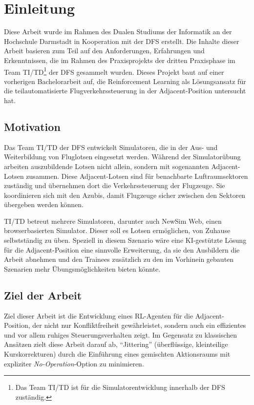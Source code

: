 \chapter{Einleitung}
\label{ch:intro}
Diese Arbeit wurde im Rahmen des Dualen Studiums der Informatik an der Hochschule Darmstadt in Kooperation mit der \ac{DFS} erstellt.
Die Inhalte dieser Arbeit basieren zum Teil auf den Anforderungen, Erfahrungen und Erkenntnissen, die im Rahmen des Praxisprojekts der dritten Praxisphase im Team 
TI/TD\footnote{Das Team TI/TD ist für die Simulatorentwicklung innerhalb der \ac{DFS} zuständig.} der \ac{DFS} gesammelt wurden. Dieses Projekt baut auf einer vorherigen Bachelorarbeit \cite{dominikDiez} auf, die Reinforcement Learning als Lösungsansatz für die teilautomatisierte Flugverkehrssteuerung in der Adjacent-Position untersucht hat.

%
%
\section{Motivation}
\label{sec:intro:motivation}
Das Team TI/TD der \ac{DFS} entwickelt Simulatoren, die in der Aus- und Weiterbildung von Fluglotsen eingesetzt werden. 
Während der Simulatorübung arbeiten auszubildende Lotsen nicht allein, sondern mit sogenannten Adjacent-Lotsen zusammen. Diese Adjacent-Lotsen sind für benachbarte Luftraumsektoren zuständig und übernehmen dort die Verkehrssteuerung der Flugzeuge. Sie koordinieren sich mit den Azubis, damit Flugzeuge sicher zwischen den Sektoren übergeben werden können. 
\medskip

TI/TD betreut mehrere Simulatoren, darunter auch NewSim Web, einen browserbasierten Simulator.
Dieser soll es Lotsen ermöglichen, von Zuhause selbstständig zu üben. Speziell in diesem Szenario wäre eine KI\hyp{}gestützte Lösung für die Adjacent-Position eine sinnvolle Erweiterung, da sie den Ausbildern die Arbeit abnehmen und den Trainees zusätzlich zu den im Vorhinein gebauten Szenarien mehr Übungsmöglichkeiten bieten könnte.
%
%
\section{Ziel der Arbeit}
\label{sec:intro:goal}

Ziel dieser Arbeit ist die Entwicklung eines \ac{RL}-Agenten für die Adjacent-Position, der nicht nur Konfliktfreiheit gewährleistet, sondern auch ein effizientes und vor allem ruhiges Steuerungsverhalten zeigt. Im Gegensatz zu klassischen Ansätzen zielt diese Arbeit darauf ab, \enquote{Jittering} (überflüssige, kleinteilige Kurskorrekturen) durch die Einführung eines gemischten Aktionsraums mit expliziter \emph{No-Operation}-Option zu minimieren.

